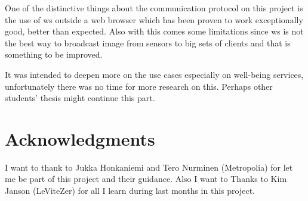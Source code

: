 \documentclass[hidelinks,11pt,a4paper,oneside,article]{memoir}
\begin{document}
 One of the distinctive things about the communication protocol on this project is the use of \gls{ws} outside a web browser which has been proven to work exceptionally good, better than expected. Also with this comes some limitations since \gls{ws} is not the best way to broadcast image from sensors to big sets of clients and that is something to be improved.

 It was intended to deepen more on the use cases especially on well-being services, unfortunately there was no time for more research on this. Perhaps other students' thesis might continue this part.




\clearpage{}
\begin{flushleft}
\begin{singlespacing}

\end{singlespacing}
\end{flushleft}

\clearpage\chapter*{Acknowledgments}
I want to thank to Jukka Honkaniemi and Tero Nurminen (Metropolia) for let me be part of this project and their guidance. Also I want to Thanks to Kim Janson (LeViteZer) for all I learn during last months in this project.

\label{LastPage}~
\end{document}
